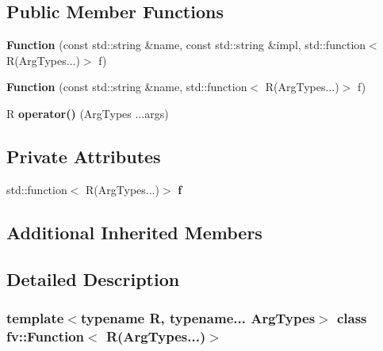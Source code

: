 \subsection*{Public Member Functions}
\begin{DoxyCompactItemize}
\item 
\hypertarget{classfv_1_1Function_3_01R_07ArgTypes_8_8_8_08_4_ad817eb370743cd056b4551d9a2c43b84}{}\label{classfv_1_1Function_3_01R_07ArgTypes_8_8_8_08_4_ad817eb370743cd056b4551d9a2c43b84} 
{\bfseries Function} (const std\+::string \&name, const std\+::string \&impl, std\+::function$<$ R(Arg\+Types...)$>$ f)
\item 
\hypertarget{classfv_1_1Function_3_01R_07ArgTypes_8_8_8_08_4_aa399197dc7e4aabd0f58da4b0d7af159}{}\label{classfv_1_1Function_3_01R_07ArgTypes_8_8_8_08_4_aa399197dc7e4aabd0f58da4b0d7af159} 
{\bfseries Function} (const std\+::string \&name, std\+::function$<$ R(Arg\+Types...)$>$ f)
\item 
\hypertarget{classfv_1_1Function_3_01R_07ArgTypes_8_8_8_08_4_a469f0f13b73bd497489272117e0a7968}{}\label{classfv_1_1Function_3_01R_07ArgTypes_8_8_8_08_4_a469f0f13b73bd497489272117e0a7968} 
R {\bfseries operator()} (Arg\+Types ...args)
\end{DoxyCompactItemize}
\subsection*{Private Attributes}
\begin{DoxyCompactItemize}
\item 
\hypertarget{classfv_1_1Function_3_01R_07ArgTypes_8_8_8_08_4_a7c512b1f9098f11b878ed0cf7f3d0c70}{}\label{classfv_1_1Function_3_01R_07ArgTypes_8_8_8_08_4_a7c512b1f9098f11b878ed0cf7f3d0c70} 
std\+::function$<$ R(Arg\+Types...)$>$ {\bfseries f}
\end{DoxyCompactItemize}
\subsection*{Additional Inherited Members}


\subsection{Detailed Description}
\subsubsection*{template$<$typename R, typename... Arg\+Types$>$\newline
class fv\+::\+Function$<$ R(\+Arg\+Types...)$>$}

